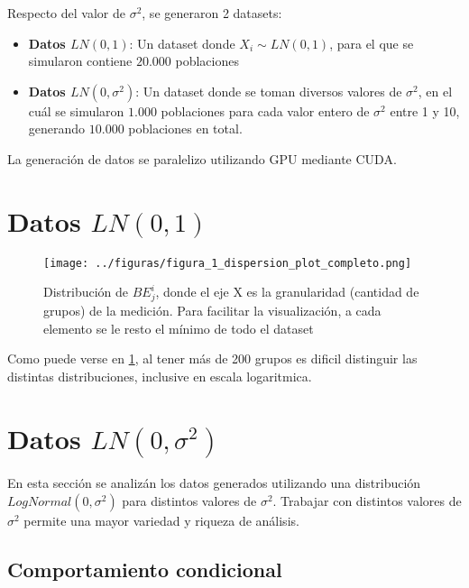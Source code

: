 Respecto del valor de $\sigma^2$, se generaron 2 datasets:

\begin{itemize}
    \item \textbf{Datos $LN(0,1)$}: Un dataset donde $X_i \sim LN(0,1)$, para el que se simularon contiene $20.000$ poblaciones
    \item \textbf{Datos $LN(0,\sigma^2)$}: Un dataset donde se toman diversos valores de $\sigma^2$, en el cuál se simularon $1.000$ poblaciones para cada valor entero de $\sigma^2$ entre 1 y 10, generando $10.000$ poblaciones en total.
\end{itemize}

La generación de datos se paralelizo utilizando GPU mediante CUDA\cite{lasorsa2024simluacion_cuda}.

\section{Datos $LN(0,1)$}

\begin{figure}[H] %
    \centering %
    \texttt{[image: ../figuras/figura\_1\_dispersion\_plot\_completo.png]} %
    \caption{Distribución de $BE_j^i$, donde el eje X es la granularidad (cantidad de grupos) de la medición. Para facilitar la visualización, a cada elemento se le resto el mínimo de todo el dataset}
    \label{fig:figura_1} %
\end{figure}

Como puede verse en \ref{fig:figura_1}, al tener más de 200 grupos es dificil distinguir las distintas distribuciones, inclusive en escala logaritmica.   

\section{Datos $LN(0,\sigma^2)$}

En esta sección se analizán los datos generados utilizando una distribución $LogNormal(0,\sigma^2)$ para distintos valores de $\sigma^2$. Trabajar con distintos valores de $\sigma^2$ permite una mayor variedad y riqueza de análisis.

\subsection{Comportamiento condicional}

